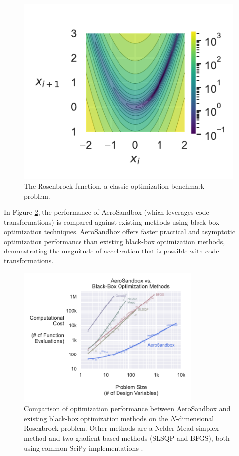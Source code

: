 \begin{figure}[H]
    \centering
    \includegraphics{../figures/rosenbrock_function.pdf}
    \caption{The Rosenbrock function, a classic optimization benchmark problem.}
    \label{fig:rosenbrock}
\end{figure}

In Figure \ref{fig:aerosandbox_scaling_comparison}, the performance of AeroSandbox (which leverages code transformations) is compared against existing methods using black-box optimization techniques. AeroSandbox offers faster practical and asymptotic optimization performance than existing black-box optimization methods, demonstrating the magnitude of acceleration that is possible with code transformations.

\begin{figure}[H]
    \centering
    \includegraphics[width=0.8\textwidth]{../figures/benchmark_nd_rosenbrock.pdf}
    \caption{Comparison of optimization performance between AeroSandbox and existing black-box optimization methods on the $N$-dimensional Rosenbrock problem. Other methods are a Nelder-Mead simplex method and two gradient-based methods (SLSQP and BFGS), both using common SciPy implementations \cite{scipy}.}
    \label{fig:aerosandbox_scaling_comparison}
\end{figure}


